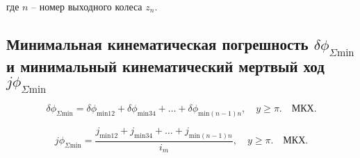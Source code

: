 где $n$ -- номер выходного колеса $z_n$.

\subsection*{Минимальная кинематическая погрешность $\delta\phi_{\Sigma \text{min}}$ и минимальный кинематический мертвый ход $j\phi_{\Sigma \text{min}}$}

\begin{equation}
    \delta\phi_{\Sigma \text{min}} = \delta\phi_{\text{min}12} + \delta\phi_{\text{min}34} + \dots + \delta\phi_{\text{min}(n-1)n}, \quad y \geq \pi. \quad \text{МКХ.} \tag{6.55}
\end{equation}

\begin{equation}
    j\phi_{\Sigma \text{min}} = \frac{j_{\text{min}12} + j_{\text{min}34} + \dots + j_{\text{min}(n-1)n}}{i_m}, \quad y \geq \pi. \quad \text{МКХ.} \tag{6.56}
\end{equation}

